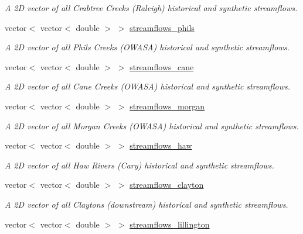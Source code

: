 \begin{DoxyCompactItemize}
\begin{DoxyCompactList}\small\item\em A 2D vector of all Crabtree Creek\textquotesingle{}s (Raleigh) historical and synthetic streamflows. \end{DoxyCompactList}\item 
vector$<$ vector$<$ double $>$ $>$ \mbox{\hyperlink{classTriangle_a936a703fc9bb94bce59bb0cbec005115}{streamflows\+\_\+phils}}
\begin{DoxyCompactList}\small\item\em A 2D vector of all Phils Creek\textquotesingle{}s (O\+W\+A\+SA) historical and synthetic streamflows. \end{DoxyCompactList}\item 
vector$<$ vector$<$ double $>$ $>$ \mbox{\hyperlink{classTriangle_a0a20ad805c77f2af96433b17eb3cc733}{streamflows\+\_\+cane}}
\begin{DoxyCompactList}\small\item\em A 2D vector of all Cane Creek\textquotesingle{}s (O\+W\+A\+SA) historical and synthetic streamflows. \end{DoxyCompactList}\item 
vector$<$ vector$<$ double $>$ $>$ \mbox{\hyperlink{classTriangle_a3426e30cdc767333d491895438bdb00f}{streamflows\+\_\+morgan}}
\begin{DoxyCompactList}\small\item\em A 2D vector of all Morgan Creek\textquotesingle{}s (O\+W\+A\+SA) historical and synthetic streamflows. \end{DoxyCompactList}\item 
vector$<$ vector$<$ double $>$ $>$ \mbox{\hyperlink{classTriangle_a2303d7ba019fa2c88ad9bcf4968b9522}{streamflows\+\_\+haw}}
\begin{DoxyCompactList}\small\item\em A 2D vector of all Haw River\textquotesingle{}s (Cary) historical and synthetic streamflows. \end{DoxyCompactList}\item 
vector$<$ vector$<$ double $>$ $>$ \mbox{\hyperlink{classTriangle_a2c59e6b06ce2824ac697ca97c2423060}{streamflows\+\_\+clayton}}
\begin{DoxyCompactList}\small\item\em A 2D vector of all Clayton\textquotesingle{}s (downstream) historical and synthetic streamflows. \end{DoxyCompactList}\item 
vector$<$ vector$<$ double $>$ $>$ \mbox{\hyperlink{classTriangle_ac69585cb9a4f8a477f030a3d66cea92f}{streamflows\+\_\+lillington}}

\end{DoxyCompactItemize}
